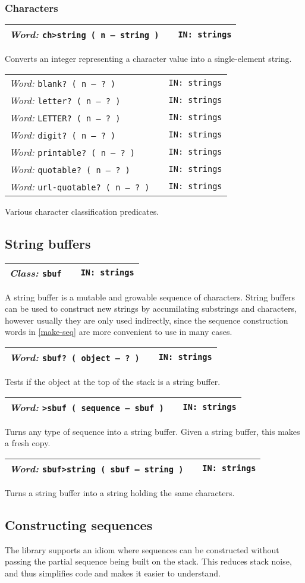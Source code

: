 \documentclass{report}
\newcommand{\ordinaryword}[3]{\index{#1}
\emph{Word:} \texttt{#2} &&\texttt{IN: #3}}
\newcommand{\classword}[2]{\index{#1}
\emph{Class:} \texttt{#1} &&\texttt{IN: #2}}
\newcommand{\wordtable}[1]{

\begin{tabularx}{12cm}[t]{lXr}
\hline
#1\\
\hline
\end{tabularx}

}
\begin{document}
\subsubsection{Characters}

\wordtable{
\ordinaryword{ch>string}{ch>string ( n -- string )}{strings}
}
Converts an integer representing a character value into a single-element string.
\wordtable{
\ordinaryword{blank?}{blank?~( n -- ?~)}{strings}\\
\ordinaryword{letter?}{letter?~( n -- ?~)}{strings}\\
\ordinaryword{LETTER?}{LETTER?~( n -- ?~)}{strings}\\
\ordinaryword{digit?}{digit?~( n -- ?~)}{strings}\\
\ordinaryword{printable?}{printable?~( n -- ?~)}{strings}\\
\ordinaryword{quotable?}{quotable?~( n -- ?~)}{strings}\\
\ordinaryword{url-quotable?}{url-quotable?~( n -- ?~)}{strings}
}
Various character classification predicates.

\subsection{String buffers}

\sbufglos
\wordtable{
\classword{sbuf}{strings}
}
A string buffer is a mutable and growable sequence of characters. String buffers can be used to construct new strings by accumilating substrings and characters, however usually they are only used indirectly, since the sequence construction words in \ref{make-seq} are more convenient to use in many cases.
\wordtable{
\ordinaryword{sbuf?}{sbuf?~( object -- ?~)}{strings}
}
Tests if the object at the top of the stack is a string buffer.
\wordtable{
\ordinaryword{>sbuf}{>sbuf~( sequence -- sbuf )}{strings}
}
Turns any type of sequence into a string buffer. Given a string buffer, this makes a fresh copy.
\wordtable{
\ordinaryword{sbuf>string}{sbuf>string~( sbuf -- string )}{strings}
}
Turns a string buffer into a string holding the same characters.

\subsection{\label{make-seq}Constructing sequences}

The library supports an idiom where sequences can be constructed without passing the partial sequence being built on the stack. This reduces stack noise, and thus simplifies code and makes it easier to understand.
\end{document}
